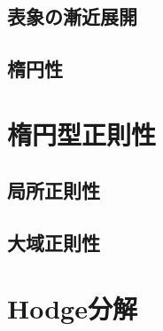\documentclass[uplatex,dvipdfmx]{jsarticle}
\begin{document}
\subsection{表象の漸近展開}

\subsection{楕円性}

\newpage
\section{楕円型正則性}

\subsection{局所正則性}

\subsection{大域正則性}

\newpage
\section{Hodge分解}


\nocite{*}

\end{document}
